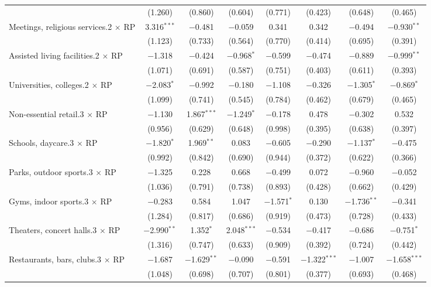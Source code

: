 \begin{table}[!htbp]
\begin{tabular}{@{\extracolsep{5pt}}lccccccc}
  & (1.260) & (0.860) & (0.604) & (0.771) & (0.423) & (0.648) & (0.465) \\ 
  Meetings, religious services.2 $\times$ RP & 3.316$^{***}$ & $-$0.481 & $-$0.059 & 0.341 & 0.342 & $-$0.494 & $-$0.930$^{**}$ \\ 
  & (1.123) & (0.733) & (0.564) & (0.770) & (0.414) & (0.695) & (0.391) \\ 
  Assisted living facilities.2 $\times$ RP & $-$1.318 & $-$0.424 & $-$0.968$^{*}$ & $-$0.599 & $-$0.474 & $-$0.889 & $-$0.999$^{**}$ \\ 
  & (1.071) & (0.691) & (0.587) & (0.751) & (0.403) & (0.611) & (0.393) \\ 
  Universities, colleges.2 $\times$ RP & $-$2.083$^{*}$ & $-$0.992 & $-$0.180 & $-$1.108 & $-$0.326 & $-$1.305$^{*}$ & $-$0.869$^{*}$ \\ 
  & (1.099) & (0.741) & (0.545) & (0.784) & (0.462) & (0.679) & (0.465) \\ 
  Non-essential retail.3 $\times$ RP & $-$1.130 & 1.867$^{***}$ & $-$1.249$^{*}$ & $-$0.178 & 0.478 & $-$0.302 & 0.532 \\ 
  & (0.956) & (0.629) & (0.648) & (0.998) & (0.395) & (0.638) & (0.397) \\ 
  Schools, daycare.3 $\times$ RP & $-$1.820$^{*}$ & 1.969$^{**}$ & 0.083 & $-$0.605 & $-$0.290 & $-$1.137$^{*}$ & $-$0.475 \\ 
  & (0.992) & (0.842) & (0.690) & (0.944) & (0.372) & (0.622) & (0.366) \\ 
  Parks, outdoor sports.3 $\times$ RP & $-$1.325 & 0.228 & 0.668 & $-$0.499 & 0.072 & $-$0.960 & $-$0.052 \\ 
  & (1.036) & (0.791) & (0.738) & (0.893) & (0.428) & (0.662) & (0.429) \\ 
  Gyms, indoor sports.3 $\times$ RP & $-$0.283 & 0.584 & 1.047 & $-$1.571$^{*}$ & 0.130 & $-$1.736$^{**}$ & $-$0.341 \\ 
  & (1.284) & (0.817) & (0.686) & (0.919) & (0.473) & (0.728) & (0.433) \\ 
  Theaters, concert halls.3 $\times$ RP & $-$2.990$^{**}$ & 1.352$^{*}$ & 2.048$^{***}$ & $-$0.534 & $-$0.417 & $-$0.686 & $-$0.751$^{*}$ \\ 
  & (1.316) & (0.747) & (0.633) & (0.909) & (0.392) & (0.724) & (0.442) \\ 
  Restaurants, bars, clubs.3 $\times$ RP & $-$1.687 & $-$1.629$^{**}$ & $-$0.090 & $-$0.591 & $-$1.322$^{***}$ & $-$1.007 & $-$1.658$^{***}$ \\ 
  & (1.048) & (0.698) & (0.707) & (0.801) & (0.377) & (0.693) & (0.468) \\ 

\end{tabular}
\end{table}
